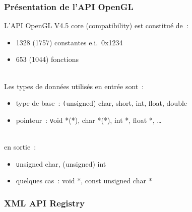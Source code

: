 
\begin{frame}
  \frametitle{Présentation de l'API OpenGL}
  L'API OpenGL V4.5 core {\tiny (compatibility)} est constitué de~:
  \begin{itemize}
  \item 1328 {\tiny (1757)} constantes e.i.\ 0x1234
  \item 653 {\tiny (1044)} fonctions
  \end{itemize} \\[.5em]
  Les types de données utilisés en entrée sont~:
  \begin{itemize}
  \item type de base~: {\texttt (unsigned) char, short, int, float, double}
  \item pointeur~: {\texttt void *(*), char *(*), int *, float *, \ldots}
  \end{itemize} \\[.5em]
  en sortie~:
  \begin{itemize}
  \item {\texttt unsigned char, (unsigned) int}
  \item quelques cas~: {void *, const unsigned char *}
  \end{itemize}
\end{frame}

\begin{frame}
  \frametitle{XML API Registry}
\end{frame}

